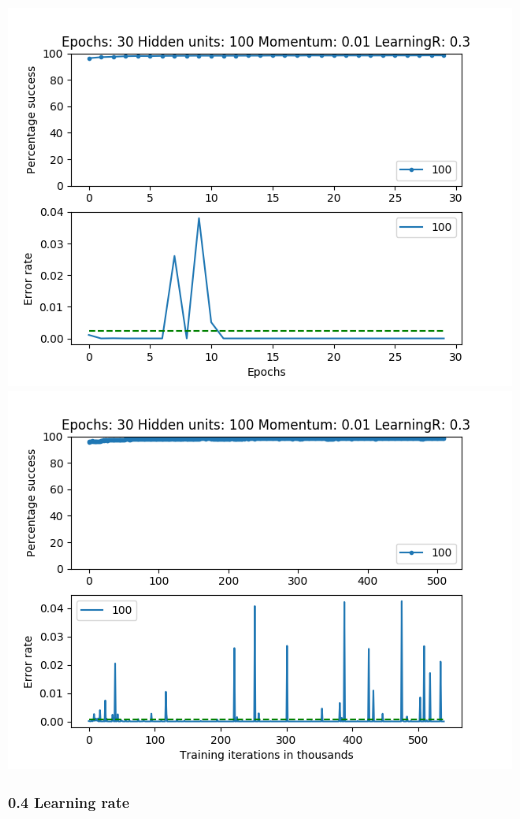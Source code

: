 \documentclass[11pt]{article}
\makeatletter
\def\maxwidth{\ifdim\Gin@nat@width>\linewidth\linewidth
    \else\Gin@nat@width\fi}
\let\Oldincludegraphics\includegraphics
\renewcommand{\includegraphics}[1]{\Oldincludegraphics[width=.8\maxwidth]{#1}}
\makeatother
\begin{document}
\includegraphics{Experiment1/E1_NN_Epoch_Momentum_0.01_30Epochs_100_LR_0.3_Hiddenunits.png}
\includegraphics{Experiment1/E1_NN_Training_Momentum_0.01_30Epochs_100_LR_0.3_Hiddenunits.png}

\hypertarget{learning-rate-3}{%
\paragraph{0.4 Learning rate}\label{learning-rate-3}}
\end{document}
